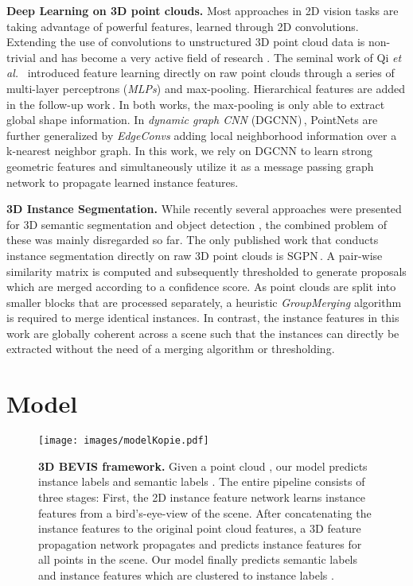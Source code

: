 \documentclass[runningheads]{llncs}
\newcommand{\subsubsubsection}[1]{\vspace{4px} \noindent \textbf{#1}}
\newcommand{\etal}{\textit{et al. }}
\begin{document}
\subsubsubsection{Deep Learning on 3D point clouds.}
Most approaches in 2D vision tasks are taking advantage of powerful features, learned through 2D convolutions.
Extending the use of convolutions to unstructured 3D point cloud data is non-trivial and has become a very active field of research \cite{Qi17CVPR,Qi17NIPS,Tatarchenko18CVPR,Wang18CoRR}.
The seminal work of Qi \etal\,\cite{Qi17CVPR} introduced feature learning directly on raw point clouds through a series of multi-layer perceptrons (\textit{MLPs}) and max-pooling.
Hierarchical features are added in the follow-up work\,\cite{Qi17NIPS}.
In both works, the max-pooling is only able to extract global shape information.
In \emph{dynamic graph CNN} (DGCNN)\,\cite{Wang18CoRR}, PointNets are further generalized by \emph{EdgeConvs} adding local neighborhood information over a k-nearest neighbor graph.
In this work, we rely on DGCNN to learn strong geometric features and simultaneously utilize it as a message passing graph network to propagate learned instance features.

\subsubsubsection{3D Instance Segmentation.}
While recently several approaches were presented for 3D semantic segmentation \cite{Qi17CVPR,Qi17NIPS,Engelmann18ECCVW,Boulch17CG,Wang18CoRR,Engelmann19CoRR,Rethage18ECCV} and object detection \cite{Zhou18CVPR,Qi2017CoRR,Chen17CVPR,Simon18CoRR}, the combined problem of these was mainly disregarded so far.
The only published work that conducts instance segmentation directly on raw 3D point clouds is SGPN\,\cite{Wang18CVPR}.
A pair-wise similarity matrix is computed and subsequently thresholded to generate proposals which are merged according to a confidence score.
As point clouds are split into smaller blocks that are processed separately, a heuristic \emph{GroupMerging} algorithm is required to merge identical instances.
In contrast, the instance features in this work are globally coherent across a scene such that the instances can directly be extracted without the need of a merging algorithm or thresholding.
 


\section{Model}
 \begin{figure}[t]
	\centering
	\texttt{[image: images/modelKopie.pdf]}
	\vspace{-9mm}
	\caption{\textbf{3D BEVIS framework.} Given a point cloud , our model predicts instance labels  and semantic labels . The entire pipeline consists of three stages: First, the 2D instance feature network learns instance features  from a bird's-eye-view  of the scene. After concatenating the instance features to the original point cloud features, a 3D feature propagation network propagates and predicts instance features for all points in the scene. Our model finally predicts semantic labels  and instance features  which are clustered to instance labels .}
	\label{fig:model}
\end{figure}
\end{document}
